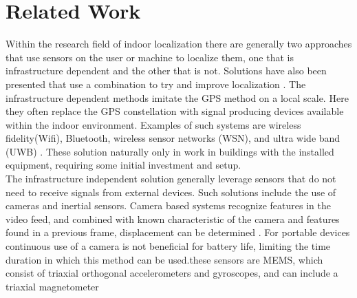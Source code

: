 \chapter{Related Work}

Within the research field of indoor localization there are generally two approaches that use sensors on the user or machine to localize them, one that is infrastructure dependent and the other that is not. Solutions have also been presented that use a combination to try and improve localization \cite{Gu2019}.
The infrastructure dependent methods imitate the GPS method on a local scale. Here they often replace the GPS constellation with signal producing devices available within the indoor environment. Examples of such systems are  wireless fidelity(Wifi), Bluetooth, wireless sensor networks (WSN), and ultra wide band (UWB) \cite{Wu2019,Jackermeier2018,Davidson2017}. These solution naturally only in work in buildings with the installed equipment, requiring some initial investment and setup.\\
The infrastructure independent solution generally leverage sensors that do not need to receive signals from external devices. Such solutions include the use of cameras and inertial sensors. Camera based systems recognize features in the video feed, and combined with known characteristic of the camera and features found in a previous frame, displacement can be determined \cite{Gu2019}. For portable devices continuous use of a camera is not beneficial for battery life, limiting the time duration in which this method can be used.these sensors are \ac{MEMS}, which consist of triaxial orthogonal accelerometers and gyroscopes, and can include a triaxial magnetometer \cite{Yang2014}


